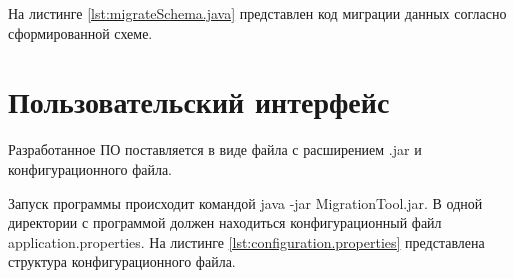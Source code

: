 \clearpage

На листинге \ref{lst:migrateSchema.java} представлен код миграции данных согласно сформированной схеме.

\clearpage












\section{Пользовательский интерфейс}
Разработанное ПО поставляется в виде файла с расширением \textmd{.jar} и конфигурационного файла.

Запуск программы происходит командой \textmd{java -jar MigrationTool.jar}. 
В одной директории с программой должен находиться конфигурационный файл \textmd{application.properties}.
На листинге \ref{lst:configuration.properties} представлена структура конфигурационного файла.

